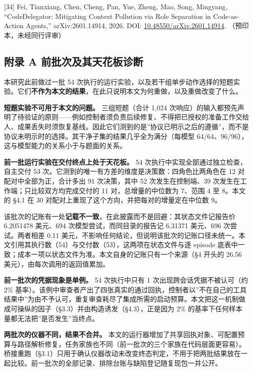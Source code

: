 \documentclass[
]{article}
\begin{document}
{[}34{]} Fei, Tianxiang, Chen, Cheng, Pan, Yue, Zheng, Mao, Song,
Mingyang, ``CodeDelegator: Mitigating Context Pollution via Role
Separation in Code-as-Action Agents,'' arXiv:2601.14914, 2026. DOI:
\href{https://doi.org/10.48550/arXiv.2601.14914}{10.48550/arXiv.2601.14914}.
（预印本，未经同行评审）

\subsection{附录 A
前批次及其天花板诊断}\label{ux9644ux5f55-a-ux524dux6279ux6b21ux53caux5176ux5929ux82b1ux677fux8bcaux65ad}

本研究此前做过一批 54
次执行的运行实验，以及若干组单步动作选择的短题实验。它们\textbf{不作为本文的结果}，在此只说明本文为何重做，以及重做改变了什么。

\textbf{短题实验不可用于本文的问题。} 三组短题（合计 1,024
次响应）的输入都预先声明了待验证的原则------例如控制者须负责后续修复、不得把已授权的准备工作交给人、成果丢失时须恢复基线。因此它们测到的是''协议已明示之后的遵循''，而不是协议未明示时的选择。其干净子集的结果几乎全为满分（每模型
64/64、96/96），这与模型能力的关系小于与题面的关系。

\textbf{前一批运行实验在交付终点上处于天花板。} 54
次执行中实现全部通过独立检查，自主交付 53
次。它测到的唯一有方差的维度是决策数：四角色比两角色在 12
对配对中全部为正，合计多出 91 次决策，其中 52 次发生在控制端、39
次发生在工作端；只比较双方均完成交付的 11 对，总增量的中位数为 7、范围 4
至 8。本文的 §4.1 在 30 对配对上重现了这个方向，并把每对的增量定在中位数
9。

该批次的记账有一处\textbf{记载不一致}，在此披露而不是回避：其状态文件记报告价
6.2051478 美元、694 次模型尝试，而同目录的报告记 6.31371 美元、696
次尝试。两者相差 0.11
美元，不影响任何结论，但说明该批次的记账口径未统一。本文引用其执行数（54）与交付数（53），这两项在状态文件与逐
episode
底表中一致；成本一项以状态文件为准。本文自身的记账只有一个来源（§4
开头的 26.56 美元），由每次调用的返回值累加。

\textbf{前一批次的凭据现象是单例。} 54 次执行中只有 1
次出现跨会话凭据不被认可（约 2\%
基率）。该例中审查者产出了四张真实的通过回执，控制者以''不在自己的工具结果中''为由不予认可，重复审查耗尽了集成所需的启动预算。本文把这一机制做成可操纵的因子（§3.3）并由构造诱发（§4.3），正是因为
2\% 的基率下任何样本量都无法把''是否发生''当终点。

\textbf{两批次的仪器不同，结果不合并。}
本文的运行器增加了共享回执对象、可配置预算与路径解析修复，任务家族也不同（前一批次的三个家族在代码层面更容易）。桥接重跑（§3.1）只用于确认仪器改动未改变终态判定，不用于把两批结果放在一起比较。前一批次的全部记录、排除台账与缺陷登记随复现包一并公开。
\end{document}
